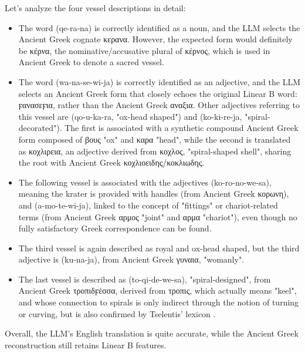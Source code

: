 Let's analyze the four vessel descriptions in detail:
\begin{itemize}
\item The word \textlinb{\Bqe\Bra\Bna} (qe-ra-na) is correctly identified as a noun, and the LLM selects the Ancient Greek cognate \textgreek{κερανα}.
However, the expected form would definitely be \textgreek{κέρνα}, the nominative/accusative plural of \textgreek{κέρνος}, which is used in Ancient Greek to denote a sacred vessel.
\item The word \textlinb{\Bwa\Bna\Bse\Bwi\Bja} (wa-na-se-wi-ja) is correctly identified as an adjective, and the LLM selects an Ancient Greek form that closely echoes the original Linear B word: \textgreek{ϝανασεϝια}, rather than the Ancient Greek \textgreek{αναξια}.
Other adjectives referring to this vessel are \textlinb{\Bqo\Bu\Bka\Bra} (qo-u-ka-ra, "ox-head shaped") and \textlinb{\Bko\Bi\Bre\Bja} (ko-ki-re-ja, "spiral-decorated").
The first is associated with a synthetic compound Ancient Greek form composed of \textgreek{βους} "ox" and \textgreek{καρα} "head", while the second is translated as \textgreek{κοχλιρεια}, an adjective derived from \textgreek{κοχλος}, "spiral-shaped shell", sharing the root with Ancient Greek \textgreek{κοχλιοειδης/κοκλιωδης}.
\item The following vessel is associated with the adjectives \textlinb{\Bko\Bro\Bno\Bwe\Bsa} (ko-ro-no-we-sa), meaning the krater is provided with handles (from Ancient Greek \textgreek{κορωνη}), and \textlinb{\Ba\Bmo\Bte\Bwi\Bja} (a-mo-te-wi-ja), linked to the concept of "fittings" or chariot-related terms (from Ancient Greek \textgreek{αρμος} "joint" and \textgreek{αρμα} "chariot"), even though no fully satisfactory Greek correspondence can be found.
\item The third vessel is again described as royal and ox-head shaped, but the third adjective is \textlinb{\Bku\Bna\Bja} (ku-na-ja), from Ancient Greek \textgreek{γυναια}, "womanly".
\item The last vessel is described as \textlinb{\Bto\Bqi\Bde\Bwe\Bsa} (to-qi-de-we-sa), "spiral-designed", from Ancient Greek \textgreek{τροπιδϝέσσα}, derived from \textgreek{τροπις}, which actually means "keel", and whose connection to spirals is only indirect through the notion of turning or curving, but is also confirmed by Tselentis' lexicon \cite{tselentis}.
\end{itemize}
Overall, the LLM's English translation is quite accurate, while the Ancient Greek reconstruction still retains Linear B features.

